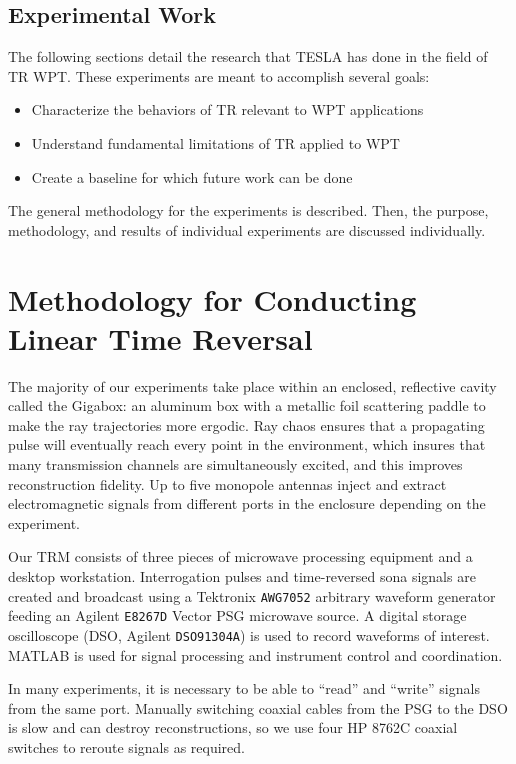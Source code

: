 \section{Experimental Work}
The following sections detail the research that TESLA has done in the field of TR WPT. These experiments are meant to accomplish several goals:

\begin{itemize}
    \item Characterize the behaviors of TR relevant to WPT applications
    \item Understand fundamental limitations of TR applied to WPT
    \item Create a baseline for which future work can be done
\end{itemize}

The general methodology for the experiments is described. Then, the purpose, methodology, and results of individual experiments are discussed individually.

\chapter{Methodology for Conducting Linear Time Reversal}
\label{ch:linear-meth}

The majority of our experiments take place within an enclosed, reflective cavity called the Gigabox: an aluminum box with a metallic foil scattering paddle to make the ray trajectories more ergodic. Ray chaos ensures that a propagating pulse will eventually reach every point in the environment, which insures that many transmission channels are simultaneously excited, and this improves reconstruction fidelity. Up to five monopole antennas inject and extract electromagnetic signals from different ports in the enclosure depending on the experiment.

Our TRM consists of three pieces of microwave processing equipment and a desktop workstation. Interrogation pulses and time-reversed sona signals are created and broadcast using a Tektronix \texttt{AWG7052} arbitrary waveform generator feeding an Agilent \texttt{E8267D} Vector PSG microwave source. A digital storage oscilloscope (DSO, Agilent \texttt{DSO91304A}) is used to record waveforms of interest. MATLAB is used for signal processing and instrument control and coordination.

In many experiments, it is necessary to be able to ``read'' and ``write'' signals from the same port. Manually switching coaxial cables from the PSG to the DSO is slow and can destroy reconstructions, so we use four HP 8762C coaxial switches to reroute signals as required.

